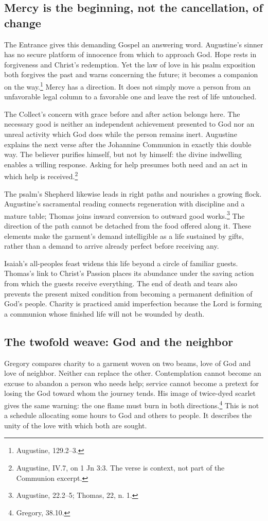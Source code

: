 \subsection{Mercy is the beginning, not the cancellation, of change}
The Entrance gives this demanding Gospel an answering word. Augustine's sinner has no secure platform of innocence from which to approach God. Hope rests in forgiveness and Christ's redemption. Yet the law of love in his psalm exposition both forgives the past and warns concerning the future; it becomes a companion on the way.\footnote{Augustine,  129.2--3.} Mercy has a direction. It does not simply move a person from an unfavorable legal column to a favorable one and leave the rest of life untouched.

The Collect's concern with grace before and after action belongs here. The necessary good is neither an independent achievement presented to God nor an unreal activity which God does while the person remains inert. Augustine explains the next verse after the Johannine Communion in exactly this double way. The believer purifies himself, but not by himself: the divine indwelling enables a willing response. Asking for help presumes both need and an act in which help is received.\footnote{Augustine,  IV.7, on 1 Jn 3:3. The verse is context, not part of the Communion excerpt.}

The psalm's Shepherd likewise leads in right paths and nourishes a growing flock. Augustine's sacramental reading connects regeneration with discipline and a mature table; Thomas joins inward conversion to outward good works.\footnote{Augustine,  22.2--5; Thomas,  22, n. 1.} The direction of the path cannot be detached from the food offered along it. These elements make the garment's demand intelligible as a life sustained by gifts, rather than a demand to arrive already perfect before receiving any.

Isaiah's all-peoples feast widens this life beyond a circle of familiar guests. Thomas's link to Christ's Passion places its abundance under the saving action from which the guests receive everything. The end of death and tears also prevents the present mixed condition from becoming a permanent definition of God's people. Charity is practiced amid imperfection because the Lord is forming a communion whose finished life will not be wounded by death.

\subsection{The twofold weave: God and the neighbor}
Gregory compares charity to a garment woven on two beams, love of God and love of neighbor. Neither can replace the other. Contemplation cannot become an excuse to abandon a person who needs help; service cannot become a pretext for losing the God toward whom the journey tends. His image of twice-dyed scarlet gives the same warning: the one flame must burn in both directions.\footnote{Gregory,  38.10.} This is not a schedule allocating some hours to God and others to people. It describes the unity of the love with which both are sought.

